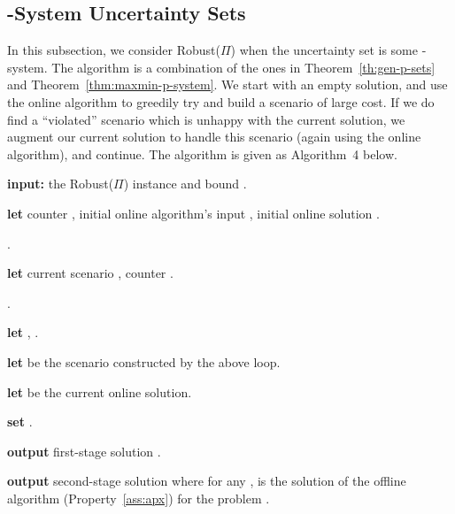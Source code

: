 \documentclass[11pt,letterpaper]{article}
\def\cov{\ensuremath{\Pi}\xspace}
\def\rcov{{\sf Robust(\cov)}\xspace}
\begin{document}
\subsection{-System Uncertainty Sets}
\label{subsec:framework-mat} In this subsection, we consider \rcov when the uncertainty set  is some
-system. The algorithm is a combination of the ones in Theorem~\ref{th:gen-p-sets} and
Theorem~\ref{thm:maxmin-p-system}.  We start with an empty solution, and use the online algorithm to greedily try and
build a scenario of large cost. If we do find a ``violated'' scenario which is unhappy with the current solution, we
augment our current solution to handle this scenario (again using the online algorithm), and continue. The algorithm is
given as Algorithm~4 below.

\begin{algorithm}
  \caption{Algorithm Robust-with--system-Uncertainty-Sets }
  \begin{algorithmic}[1]
  \STATE \textbf{input:} the \rcov instance and bound .

    \STATE \textbf{let} counter , initial online
    algorithm's input , initial online solution
    .

    \REPEAT

   .

    \STATE \textbf{let} current scenario ,
    counter .


    \STATE .

    \STATE \textbf{let} ,
    .

    \ENDWHILE

    \STATE \label{step:mm} \textbf{let}  be the
    scenario constructed by the above loop.

    \STATE \label{step:online} \textbf{let}  be the current online solution.


    \UNTIL{} \label{step:aug}

\STATE  \textbf{set} .

    \STATE \textbf{output} first-stage solution .

  \STATE \textbf{output} second-stage solution  where for any ,  is the solution of
  the offline algorithm (Property~\ref{ass:apx}) for the problem .

\end{algorithmic}
\end{algorithm}
\end{document}

